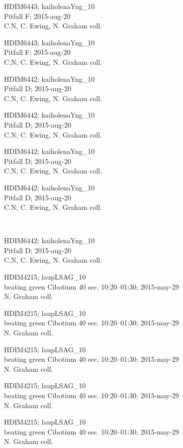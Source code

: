 \documentclass[2pt]{extarticle}
\begin{document}
\noindent
\parbox{0.16\textwidth}{\tiny \raggedright \rule[-0.3\baselineskip]{0pt}{10pt}HDIM6443; kaiholenaYng\_10\\ Pitfall F; 2015-aug-20\\ C.N, C. Ewing, N. Graham coll.}
\parbox{0.16\textwidth}{\tiny \raggedright \rule[-0.3\baselineskip]{0pt}{10pt}HDIM6443; kaiholenaYng\_10\\ Pitfall F; 2015-aug-20\\ C.N, C. Ewing, N. Graham coll.}
\parbox{0.16\textwidth}{\tiny \raggedright \rule[-0.3\baselineskip]{0pt}{10pt}HDIM6442; kaiholenaYng\_10\\ Pitfall D; 2015-aug-20\\ C.N, C. Ewing, N. Graham coll.}
\parbox{0.16\textwidth}{\tiny \raggedright \rule[-0.3\baselineskip]{0pt}{10pt}HDIM6442; kaiholenaYng\_10\\ Pitfall D; 2015-aug-20\\ C.N, C. Ewing, N. Graham coll.}
\parbox{0.16\textwidth}{\tiny \raggedright \rule[-0.3\baselineskip]{0pt}{10pt}HDIM6442; kaiholenaYng\_10\\ Pitfall D; 2015-aug-20\\ C.N, C. Ewing, N. Graham coll.}
\parbox{0.16\textwidth}{\tiny \raggedright \rule[-0.3\baselineskip]{0pt}{10pt}HDIM6442; kaiholenaYng\_10\\ Pitfall D; 2015-aug-20\\ C.N, C. Ewing, N. Graham coll.} \\ 
\vspace{0.001in} 

\noindent
\parbox{0.16\textwidth}{\tiny \raggedright \rule[-0.3\baselineskip]{0pt}{10pt}HDIM6442; kaiholenaYng\_10\\ Pitfall D; 2015-aug-20\\ C.N, C. Ewing, N. Graham coll.}
\parbox{0.16\textwidth}{\tiny \raggedright \rule[-0.3\baselineskip]{0pt}{10pt}HDIM4215; laupLSAG\_10\\ beating green Cibotium 40 sec. 10:20--01:30; 2015-may-29\\ N. Graham coll.}
\parbox{0.16\textwidth}{\tiny \raggedright \rule[-0.3\baselineskip]{0pt}{10pt}HDIM4215; laupLSAG\_10\\ beating green Cibotium 40 sec. 10:20--01:30; 2015-may-29\\ N. Graham coll.}
\parbox{0.16\textwidth}{\tiny \raggedright \rule[-0.3\baselineskip]{0pt}{10pt}HDIM4215; laupLSAG\_10\\ beating green Cibotium 40 sec. 10:20--01:30; 2015-may-29\\ N. Graham coll.}
\parbox{0.16\textwidth}{\tiny \raggedright \rule[-0.3\baselineskip]{0pt}{10pt}HDIM4215; laupLSAG\_10\\ beating green Cibotium 40 sec. 10:20--01:30; 2015-may-29\\ N. Graham coll.}
\parbox{0.16\textwidth}{\tiny \raggedright \rule[-0.3\baselineskip]{0pt}{10pt}HDIM4215; laupLSAG\_10\\ beating green Cibotium 40 sec. 10:20--01:30; 2015-may-29\\ N. Graham coll.} \\ 
\vspace{0.001in} 
\end{document}
